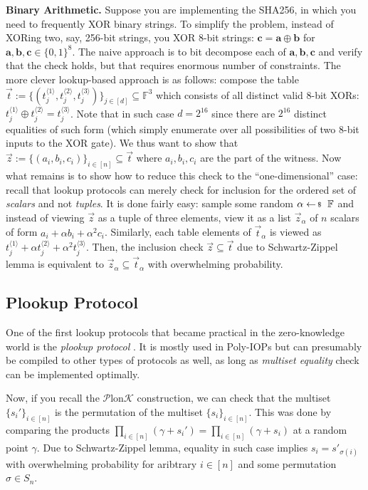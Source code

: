 \textbf{Binary Arithmetic.} Suppose you are implementing the SHA256, in which
you need to frequently XOR binary strings. To simplify the problem, instead of
XORing two, say, 256-bit strings, you XOR 8-bit strings: $\mathbf{c} =
\mathbf{a} \oplus \mathbf{b}$ for $\mathbf{a},\mathbf{b},\mathbf{c} \in
\{0,1\}^8$. The naive approach is to bit decompose each of
$\mathbf{a},\mathbf{b},\mathbf{c}$ and verify that the check holds, but that
requires enormous number of constraints. The more clever lookup-based approach
is as follows: compose the table $\vec{t} := \{(t_j^{\langle 1
\rangle},t_j^{\langle 2 \rangle},t_j^{\langle 3 \rangle})\}_{j \in [d]}
\subseteq \mathbb{F}^3$ which consists of all distinct valid 8-bit XORs:
$t_j^{\langle 1 \rangle} \oplus t_j^{\langle 2 \rangle}=t_j^{\langle 3
\rangle}$. Note that in such case $d=2^{16}$ since there are $2^{16}$ distinct
equalities of such form (which simply enumerate over all possibilities of two
8-bit inputs to the XOR gate). We thus want to show that $\vec{z} :=
\{(a_i,b_i,c_i)\}_{i \in [n]} \subseteq \vec{t}$ where $a_i,b_i,c_i$ are the
part of the witness. Now what remains is to show how to reduce this check to the
``one-dimensional'' case: recall that lookup protocols can merely check for
inclusion for the ordered set of \textit{scalars} and not \textit{tuples}. It is
done fairly easy: sample some random $\alpha \leftarrowS \mathbb{F}$ and instead
of viewing $\vec{z}$ as a tuple of three elements, view it as a list
$\vec{z}_{\alpha}$ of $n$ scalars of form $a_i+\alpha b_i+\alpha^2 c_i$.
Similarly, each table elements of $\vec{t}_{\alpha}$ is viewed as $t_j^{\langle
1 \rangle} + \alpha t_j^{\langle 2 \rangle} + \alpha^2 t_j^{\langle 3 \rangle}$.
Then, the inclusion check $\vec{z} \subseteq \vec{t}$ due to Schwartz-Zippel
lemma is equivalent to $\vec{z}_{\alpha} \subseteq \vec{t}_{\alpha}$ with
overwhelming probability.

\subsection{Plookup Protocol}

One of the first lookup protocols that became practical in the zero-knowledge
world is the \textit{plookup protocol} \cite{plookup}. It is mostly used in Poly-IOPs but can
presumably be compiled to other types of protocols as well, as long as
\textit{multiset equality} check can be implemented optimally.

Now, if you recall the $\mathcal{P}$lon$\mathcal{K}$ construction, we can check
that the multiset $\{s_i'\}_{i \in [n]}$ is the permutation of the multiset
$\{s_i\}_{i \in [n]}$. This was done by comparing the products $\prod_{i \in
[n]}(\gamma+s_i')=\prod_{i \in [n]}(\gamma+s_i)$ at a random point $\gamma$. Due
to Schwartz-Zippel lemma, equality in such case implies $s_{i}=s'_{\sigma(i)}$
with overwhelming probability for aribtrary $i \in [n]$ and some permutation $\sigma
\in S_n$.

